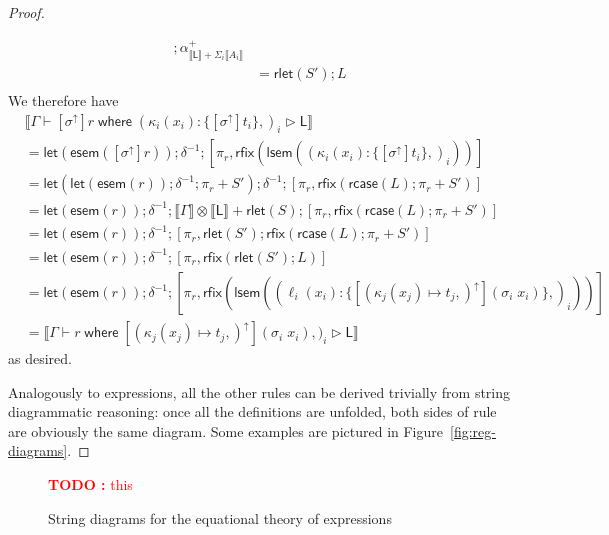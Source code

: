 \documentclass[acmsmall,screen,review]{acmart}
\newcounter{todos}
\newcommand{\TODO}[1]{{
  \stepcounter{todos}
  \begin{center}\large{\textcolor{red}{\textbf{TODO \arabic{todos}:} #1}}\end{center}
}}
\newcommand{\ms}[1]{\ensuremath{\mathsf{#1}}}
\newcommand{\lto}{:}
\newcommand{\where}[2]{#1\;\ms{where}\;#2}
\newcommand{\wbranch}[3]{#1(#2) \lto \{#3\}}
\newcommand{\upg}[1]{{#1}^\uparrow}
\newcommand{\haslb}[3]{#1 \vdash #2 \rhd #3}
\newcommand{\dnt}[1]{\llbracket{#1}\rrbracket}
\newcommand{\entrymor}[1]{\ms{esem}(#1)}
\newcommand{\loopmor}[1]{\ms{lsem}(#1)}
\newcommand{\lmor}[1]{\ms{let}(#1)}
\newcommand{\rlmor}[1]{\ms{rlet}(#1)}
\newcommand{\rcase}[1]{\ms{rcase}(#1)}
\newcommand{\rfix}[1]{\ms{rfix}(#1)}
\begin{document}
\begin{proof}
\begin{itemize}[leftmargin=*]
\begin{equation}
\begin{aligned}
          ; \alpha^+_{\dnt{\ms{L}} + \Sigma_i \dnt{A_i}} \\
        & = \rlmor{S'} ; L \\
      \end{aligned}
    \end{equation}
    We therefore have
    \begin{equation}
      \begin{aligned}
        & \dnt{\haslb{\Gamma}
          {\where{[\upg{\sigma}]r}{(\wbranch{\kappa_i}{x_i}{[\upg{\sigma}]t_i},)_i}}
          {\ms{L}}} \\
        & = \lmor{\entrymor{[\upg{\sigma}]r}} ; \delta^{-1} ; [\pi_r,
          \rfix{\loopmor{(\wbranch{\kappa_i}{x_i}{[\upg{\sigma}]t_i},)_i}}] \\
        & = \lmor{\lmor{\entrymor{r}} ; \delta^{-1} ; \pi_r + S'} ; \delta^{-1}
          ; [
              \pi_r,
              \rfix{\rcase{L} ; \pi_r + S'}
          ] \\
        & = \lmor{\entrymor{r}} ; \delta^{-1} 
          ; \dnt{\Gamma} \otimes \dnt{\ms{L}} + \rlmor{S}
          ; [
            \pi_r,
            \rfix{\rcase{L} ; \pi_r + S'}
          ] \\
        & = \lmor{\entrymor{r}} ; \delta^{-1} 
        ; [
          \pi_r,
          \rlmor{S'}
          ; \rfix{\rcase{L} ; \pi_r + S'}
        ] \\
        & = \lmor{\entrymor{r}} ; \delta^{-1} 
        ; [
          \pi_r,
          \rfix{\rlmor{S'} ; L}
        ] \\
        & = \lmor{\entrymor{r}} ; \delta^{-1} 
        ; [
          \pi_r,
          \rfix{
            \loopmor{(\wbranch{\ell_i}{x_i}
                    {[\upg{(\kappa_j(x_j) \mapsto t_j,)}](\sigma_i\;x_i)},)_i}}
        ] \\
        & = \dnt{\haslb{\Gamma}
          {\where{r}{[\upg{(\kappa_j(x_j) \mapsto t_j,)}](\sigma_i\;x_i)},)_i}{\ms{L}}}
      \end{aligned}
    \end{equation}
    as desired.
  \end{itemize}
  Analogously to expressions, all the other rules can be derived trivially from string diagrammatic
  reasoning: once all the definitions are unfolded, both sides of rule are obviously the same
  diagram. Some examples are pictured in Figure~\ref{fig:reg-diagrams}.
\end{proof}

\begin{figure}
  \TODO{this}
  \caption{String diagrams for the equational theory of expressions}
  \Description{}
  \label{fig:expr-diagrams}
\end{figure}
\end{document}

